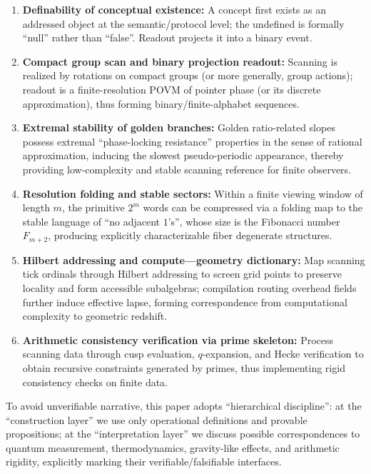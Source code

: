 \begin{enumerate}
  \item \textbf{Definability of conceptual existence:} A concept first exists as an addressed object at the semantic/protocol level; the undefined is formally ``null'' rather than ``false''. Readout projects it into a binary event.
  \item \textbf{Compact group scan and binary projection readout:} Scanning is realized by rotations on compact groups (or more generally, group actions); readout is a finite-resolution POVM of pointer phase (or its discrete approximation), thus forming binary/finite-alphabet sequences.
  \item \textbf{Extremal stability of golden branches:} Golden ratio-related slopes possess extremal ``phase-locking resistance'' properties in the sense of rational approximation, inducing the slowest pseudo-periodic appearance, thereby providing low-complexity and stable scanning reference for finite observers.
  \item \textbf{Resolution folding and stable sectors:} Within a finite viewing window of length $m$, the primitive $2^m$ words can be compressed via a folding map to the stable language of ``no adjacent $1$'s'', whose size is the Fibonacci number $F_{m+2}$, producing explicitly characterizable fiber degenerate structures.
  \item \textbf{Hilbert addressing and compute---geometry dictionary:} Map scanning tick ordinals through Hilbert addressing to screen grid points to preserve locality and form accessible subalgebras; compilation routing overhead fields further induce effective lapse, forming correspondence from computational complexity to geometric redshift.
  \item \textbf{Arithmetic consistency verification via prime skeleton:} Process scanning data through cusp evaluation, $q$-expansion, and Hecke verification to obtain recursive constraints generated by primes, thus implementing rigid consistency checks on finite data.
\end{enumerate}

To avoid unverifiable narrative, this paper adopts ``hierarchical discipline'': at the ``construction layer'' we use only operational definitions and provable propositions; at the ``interpretation layer'' we discuss possible correspondences to quantum measurement, thermodynamics, gravity-like effects, and arithmetic rigidity, explicitly marking their verifiable/falsifiable interfaces.
